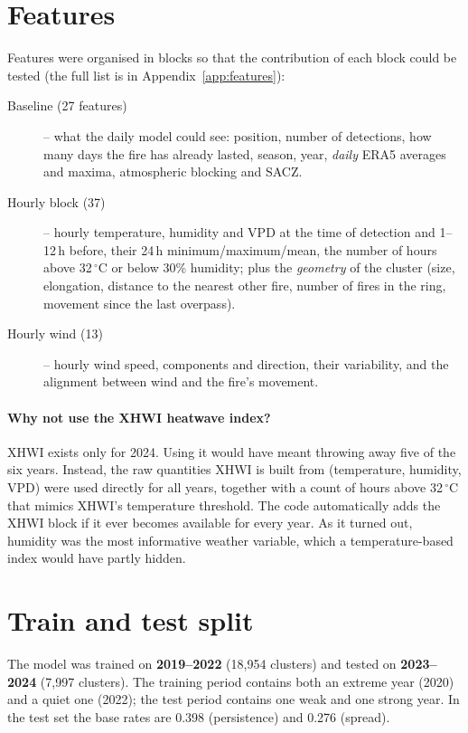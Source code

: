 \documentclass[11pt,a4paper,oneside]{report}
\begin{document}
\section{Features}

Features were organised in blocks so that the contribution of each block could be
tested (the full list is in Appendix~\ref{app:features}):

\begin{description}
  \item[Baseline (27 features)] -- what the daily model could see: position, number
        of detections, how many days the fire has already lasted, season, year,
        \emph{daily} ERA5 averages and maxima, atmospheric blocking and SACZ.
  \item[Hourly block (37)] -- hourly temperature, humidity and VPD at the time of
        detection and 1--12\,h before, their 24\,h minimum/maximum/mean, the
        number of hours above 32\,$^\circ$C or below 30\% humidity; plus the
        \emph{geometry} of the cluster (size, elongation, distance to the nearest
        other fire, number of fires in the ring, movement since the last
        overpass).
  \item[Hourly wind (13)] -- hourly wind speed, components and direction, their
        variability, and the alignment between wind and the fire's movement.
\end{description}

\paragraph{Why not use the XHWI heatwave index?} XHWI exists only for 2024. Using
it would have meant throwing away five of the six years. Instead, the raw
quantities XHWI is built from (temperature, humidity, VPD) were used directly
for all years, together with a count of hours above 32\,$^\circ$C that mimics
XHWI's temperature threshold. The code automatically adds the XHWI block if it
ever becomes available for every year. As it turned out, humidity was the most
informative weather variable, which a temperature-based index would have partly
hidden.

\section{Train and test split}

The model was trained on \textbf{2019--2022} (18{,}954 clusters) and tested on
\textbf{2023--2024} (7{,}997 clusters). The training period contains both an
extreme year (2020) and a quiet one (2022); the test period contains one weak and
one strong year. In the test set the base rates are 0.398 (persistence) and
0.276 (spread).
\end{document}
